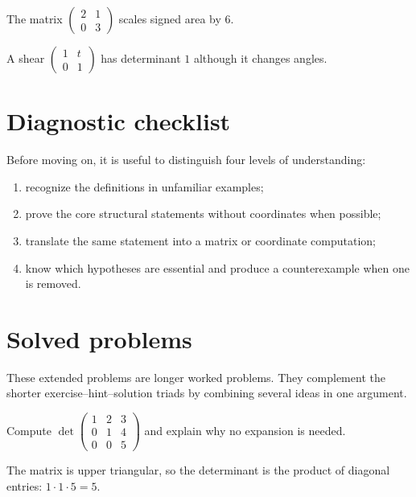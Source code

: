 \begin{example}\label{ex:i08-worked-02}
The matrix $\begin{pmatrix}2&1\\0&3\end{pmatrix}$ scales signed area by $6$.
\end{example}

\begin{example}[Shear]\label{ex:i08-worked-03}
A shear $\begin{pmatrix}1&t\\0&1\end{pmatrix}$ has determinant $1$ although it changes angles.
\end{example}

\section{Diagnostic checklist}
Before moving on, it is useful to distinguish four levels of understanding:
\begin{enumerate}
\item recognize the definitions in unfamiliar examples;
\item prove the core structural statements without coordinates when possible;
\item translate the same statement into a matrix or coordinate computation;
\item know which hypotheses are essential and produce a counterexample when one is removed.
\end{enumerate}

\section{Solved problems}
These extended problems are longer worked problems. They complement the shorter exercise--hint--solution triads by combining several ideas in one argument.

\begin{problem}\label{prob:i08-problem-01}
Compute $\det\begin{pmatrix}1&2&3\\0&1&4\\0&0&5\end{pmatrix}$ and explain why no expansion is needed.
\end{problem}
\begin{solution}
The matrix is upper triangular, so the determinant is the product of diagonal entries: $1\cdot1\cdot5=5$.
\end{solution}

